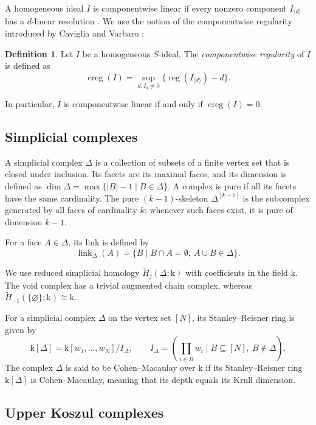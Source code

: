 \documentclass[12pt]{amsart}
\theoremstyle{definition}
\newtheorem{definition}[theorem]{Definition}
\theoremstyle{remark}
\DeclareMathOperator{\reg}{reg}
\begin{document}
A homogeneous ideal $I$ is componentwise linear if every nonzero component $I_{\langle d \rangle}$ has a $d$-linear resolution \cite{HH}. We use the notion of the componentwise regularity introduced by Caviglia and Varbaro \cite[Definition~1.1]{CV}:

\begin{definition}
Let $I$ be a homogeneous $S$-ideal. The \emph{componentwise regularity} of $I$ is defined as
\[
\operatorname{creg}(I) = \sup_{d : I_d \neq 0} \{\reg(I_{\langle d \rangle}) - d\}.
\]
\end{definition}

In particular, $I$ is componentwise linear if and only if $\operatorname{creg}(I) = 0$.

\subsection{Simplicial complexes}

A simplicial complex $\Delta$ is a collection of subsets of a finite vertex set that is closed under inclusion. Its facets are its maximal faces, and its dimension is defined as $\dim \Delta = \max\{|B| - 1 \mid B \in \Delta\}$. A complex is pure if all its facets have the same cardinality. The pure $(k-1)$-skeleton $\Delta^{[k-1]}$ is the subcomplex generated by all faces of cardinality $k$; whenever such faces exist, it is pure of dimension $k-1$. 

For a face $A \in \Delta$, its link is defined by
\[
\operatorname{link}_\Delta(A) = \{B \mid B \cap A = \emptyset, \ A \cup B \in \Delta\}.
\]

We use reduced simplicial homology $\widetilde{H}_j(\Delta; \mathrm{k})$ with coefficients in the field $\mathrm{k}$. The void complex has a trivial augmented chain complex, whereas $\widetilde{H}_{-1}(\{\varnothing\}; \mathrm{k}) \cong \mathrm{k}$.

For a simplicial complex $\Delta$ on the vertex set $[N]$, its Stanley--Reisner ring is given by
\[
\mathrm{k}[\Delta] = \mathrm{k}[w_1, \ldots, w_N] / I_\Delta,
\qquad
I_\Delta = \left(\prod_{i \in B} w_i \;\Bigg|\; B \subseteq [N], \ B \notin \Delta\right).
\]
The complex $\Delta$ is said to be Cohen--Macaulay over $\mathrm{k}$ if its Stanley--Reisner ring $\mathrm{k}[\Delta]$ is Cohen--Macaulay, meaning that its depth equals its Krull dimension.

\subsection{Upper Koszul complexes}
\end{document}
